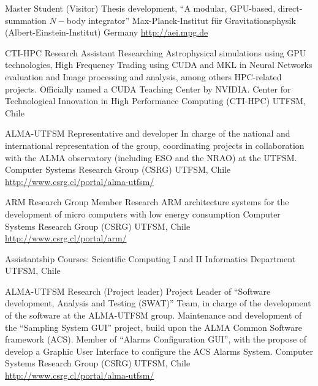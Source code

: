 \documentclass[12pt,a4paper]{moderncv}
\newcommand{\gray}{\textcolor{gray}}
\newcommand{\myurl}[1]{\gray{\url{#1}}}
\newcommand{\aei}{Max-Planck-Institut für Gravitationsphysik (Albert-Einstein-Institut)}
\begin{document}
\newpage
{}
        {Master Student (Visitor)}
        {Thesis development, %
        ``A modular, GPU-based, direct-summation $N-$body integrator'' }
        {\aei}
        {Germany}
        {\myurl{http://aei.mpg.de}}

        {CTI-HPC Research Assistant}
        {Researching %
         Astrophysical simulations using GPU technologies, %
         High Frequency Trading using CUDA and MKL in Neural Networks evaluation %
         and Image processing and analysis, among others HPC-related projects.\newline
         Officially named a CUDA Teaching Center by NVIDIA.}
        {Center for Technological Innovation in High Performance Computing (CTI-HPC)}
        {UTFSM, Chile}
        {}

        {ALMA-UTFSM Representative and developer}
        {In charge of the national and international representation of the group,
         coordinating projects in collaboration with the ALMA observatory
         (including ESO and the NRAO) at the UTFSM.}
        {Computer Systems Research Group (CSRG)}
        {UTFSM, Chile}
        {\myurl{http://www.csrg.cl/portal/alma-utfsm/}}

        {ARM Research Group Member}
        {Research ARM architecture systems for the development of micro computers
         with low energy consumption}
        {Computer Systems Research Group (CSRG)}
        {UTFSM, Chile}
        {\myurl{http://www.csrg.cl/portal/arm/}}

        {Assistantship}
        {Courses: Scientific Computing I and II}
        {Informatics Department}
        {UTFSM, Chile}
        {}

        {ALMA-UTFSM Research (Project leader)}
        {Project Leader of ``Software development, Analysis and Testing (SWAT)''
         Team, in charge of the development of the software at the ALMA-UTFSM group.
         Maintenance and development of the ``Sampling System GUI'' project,
         build upon the ALMA Common Software framework (ACS).
         Member of ``Alarms Configuration GUI'', with the propose of develop a
         Graphic User Interface to configure the ACS Alarms System.}
        {Computer Systems Research Group (CSRG)}
        {UTFSM, Chile}
        {\myurl{http://www.csrg.cl/portal/alma-utfsm/}}
\end{document}
